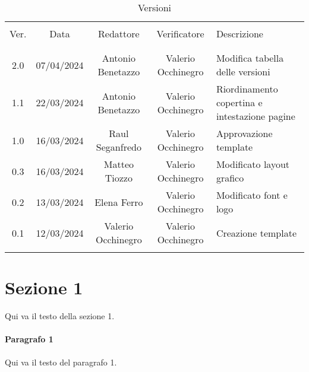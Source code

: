 \documentclass[italian,12pt]{article}
\begin{document}


\newpage



\begin{table}[!h]
	\caption{Versioni}
	\begin{center}
		\begin{tabular}{ c c c c p{9cm} }
			\hline                                                                                                      \\[-2ex]
			Ver. & Data       & Redattore          & Verificatore       & Descrizione                                   \\
			\\[-2ex] \hline \\[-1.5ex]
			2.0  & 07/04/2024 & Antonio Benetazzo  & Valerio Occhinegro & Modifica tabella delle versioni               \\
			1.1  & 22/03/2024 & Antonio Benetazzo  & Valerio Occhinegro & Riordinamento copertina e intestazione pagine \\
			1.0  & 16/03/2024 & Raul Seganfredo    & Valerio Occhinegro & Approvazione template                         \\
			0.3  & 16/03/2024 & Matteo Tiozzo      & Valerio Occhinegro & Modificato layout grafico                     \\
			0.2  & 13/03/2024 & Elena Ferro        & Valerio Occhinegro & Modificato font e logo                        \\
			0.1  & 12/03/2024 & Valerio Occhinegro & Valerio Occhinegro & Creazione template                            \\
			\\[-1.5ex] \hline
		\end{tabular}
	\end{center}
\end{table}

\newpage

\tableofcontents

\newpage

\section{Sezione 1}
Qui va il testo della sezione 1.

\paragraph{Paragrafo 1}
Qui va il testo del paragrafo 1.
\end{document}
